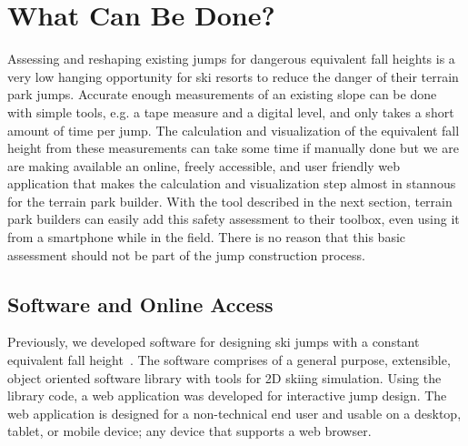 \documentclass{article}
\begin{document}
\section{What Can Be Done?}
%
Assessing and reshaping existing jumps for dangerous equivalent fall heights is
a very low hanging opportunity for ski resorts to reduce the danger of their
terrain park jumps. Accurate enough measurements of an existing slope can be
done with simple tools, e.g. a tape measure and a digital level, and only takes
a short amount of time per jump. The calculation and visualization of the
equivalent fall height from these measurements can take some time if manually
done but we are are making available an online, freely accessible, and user
friendly web application that makes the calculation and visualization step
almost in stannous for the terrain park builder. With the tool described in the
next section, terrain park builders can easily add this safety assessment to
their toolbox, even using it from a smartphone while in the field. There is no
reason that this basic assessment should not be part of the jump construction
process.

\subsection{Software and Online Access}
%
Previously, we developed software for designing ski jumps with a constant
equivalent fall height~\cite{Moore2018}. The software comprises of a general
purpose, extensible, object oriented software library with tools for 2D skiing
simulation. Using the library code, a web application was developed for
interactive jump design. The web application is designed for a non-technical
end user and usable on a desktop, tablet, or mobile device; any device that
supports a web browser.
\end{document}
